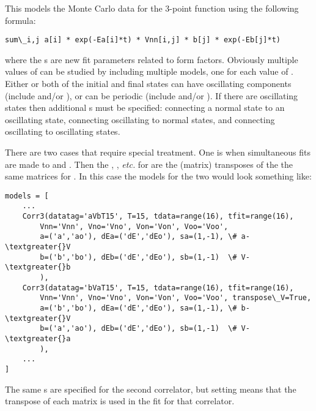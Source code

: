 \documentclass[letterpaper,10pt,english]{sphinxmanual}
\begin{document}
This models the Monte Carlo data for the 3-point function using the
following formula:

\begin{Verbatim}[commandchars=\\\{\}]
sum\_i,j a[i] * exp(-Ea[i]*t) * Vnn[i,j] * b[j] * exp(-Eb[j]*t)
\end{Verbatim}

where the s are new fit parameters related to  form
factors. Obviously multiple values of  can be studied by including
multiple {\hyperref[corrfitter:corrfitter.Corr3]{}} models, one for each value of . Either or both of the
initial and final states can have oscillating components (include 
and/or ), or can be periodic (include  and/or ). If
there are oscillating states then additional s must be specified:
 connecting a normal state to an oscillating state, 
connecting oscillating to normal states, and  connecting oscillating
to oscillating states.

There are two cases that require special treatment. One is when
simultaneous fits are made to  and . Then the
, , \emph{etc.} for  are the (matrix) transposes of
the the same matrices for . In this case the models for the two
would look something like:

\begin{Verbatim}[commandchars=\\\{\}]
models = [
    ...
    Corr3(datatag='aVbT15', T=15, tdata=range(16), tfit=range(16),
        Vnn='Vnn', Vno='Vno', Von='Von', Voo='Voo',
        a=('a','ao'), dEa=('dE','dEo'), sa=(1,-1), \# a-\textgreater{}V
        b=('b','bo'), dEb=('dE','dEo'), sb=(1,-1)  \# V-\textgreater{}b
        ),
    Corr3(datatag='bVaT15', T=15, tdata=range(16), tfit=range(16),
        Vnn='Vnn', Vno='Vno', Von='Von', Voo='Voo', transpose\_V=True,
        a=('b','bo'), dEa=('dE','dEo'), sa=(1,-1), \# b-\textgreater{}V
        b=('a','ao'), dEb=('dE','dEo'), sb=(1,-1)  \# V-\textgreater{}a
        ),
    ...
]
\end{Verbatim}

The same s are specified for the second correlator, but setting
 means that the transpose of each matrix is used
in the fit for that correlator.
\end{document}
